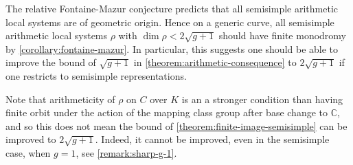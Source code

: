 \begin{remark}
\notready\label{remark:fontaine-mazur}
	The relative Fontaine-Mazur conjecture predicts that all semisimple arithmetic  local systems
	are of geometric origin. Hence on a generic curve, all semisimple arithmetic local systems $\rho$ with $\dim \rho< 2 \sqrt{g+1}$ should  have finite monodromy by
	\autoref{corollary:fontaine-mazur}.
	In particular, this suggests one should be able to improve the bound of $\sqrt{g+1}$ in
	\autoref{theorem:arithmetic-consequence} to $2 \sqrt{g+1}$ if one
	restricts to semisimple representations.

Note that arithmeticity of $\rho$ on $C$ over $K$ is an a stronger condition than having finite orbit under
the action of the mapping class group after base change to $\mathbb C$, and so
this does not mean the bound of \autoref{theorem:finite-image-semisimple} can be improved
to $2 \sqrt{g+1}$. Indeed, it cannot be improved, even in the semisimple case, when $g = 1$, see
\autoref{remark:sharp-g-1}.
\end{remark}


